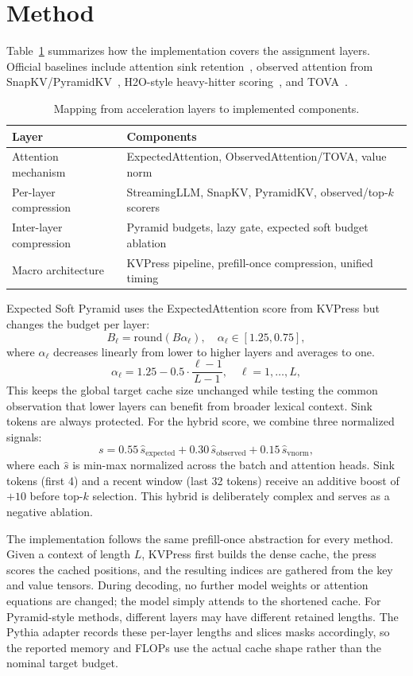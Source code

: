 \documentclass{article}
\begin{document}
\section{Method}

Table~\ref{tab:layers} summarizes how the implementation covers the assignment layers. Official baselines include attention sink retention~\citep{xiao2023streamingllm}, observed attention from SnapKV/PyramidKV~\citep{li2024snapkv,cai2024pyramidkv}, H2O-style heavy-hitter scoring~\citep{zhang2023h2o}, and TOVA~\citep{tova2024}.

\begin{table}[h]
\centering
\small
\caption{Mapping from acceleration layers to implemented components.}
\label{tab:layers}
\begin{tabular}{ll}
\toprule
Layer & Components \\
\midrule
Attention mechanism & ExpectedAttention, ObservedAttention/TOVA, value norm \\
Per-layer compression & StreamingLLM, SnapKV, PyramidKV, observed/top-$k$ scorers \\
Inter-layer compression & Pyramid budgets, lazy gate, expected soft budget ablation \\
Macro architecture & KVPress pipeline, prefill-once compression, unified timing \\
\bottomrule
\end{tabular}
\end{table}

Expected Soft Pyramid uses the ExpectedAttention score from KVPress but changes the budget per layer:
\[
B_\ell=\mathrm{round}(B\alpha_\ell),\quad
\alpha_\ell\in[1.25,0.75],
\]
where $\alpha_\ell$ decreases linearly from lower to higher layers and averages to one. 
\[
\alpha_\ell = 1.25 - 0.5 \cdot \frac{\ell-1}{L-1}, \quad \ell=1,\dots,L,
\]
This keeps the global target cache size unchanged while testing the common observation that lower layers can benefit from broader lexical context. Sink tokens are always protected. For the hybrid score, we combine three normalized signals:
\[
s = 0.55\,\hat{s}_{\mathrm{expected}} + 0.30\,\hat{s}_{\mathrm{observed}} + 0.15\,\hat{s}_{\mathrm{vnorm}},
\]
where each $\hat{s}$ is min-max normalized across the batch and attention heads. Sink tokens (first 4) and a recent window (last 32 tokens) receive an additive boost of $+10$ before top-$k$ selection. This hybrid is deliberately complex and serves as a negative ablation.

The implementation follows the same prefill-once abstraction for every method. Given a context of length $L$, KVPress first builds the dense cache, the press scores the cached positions, and the resulting indices are gathered from the key and value tensors. During decoding, no further model weights or attention equations are changed; the model simply attends to the shortened cache. For Pyramid-style methods, different layers may have different retained lengths. The Pythia adapter records these per-layer lengths and slices masks accordingly, so the reported memory and FLOPs use the actual cache shape rather than the nominal target budget.
\end{document}
